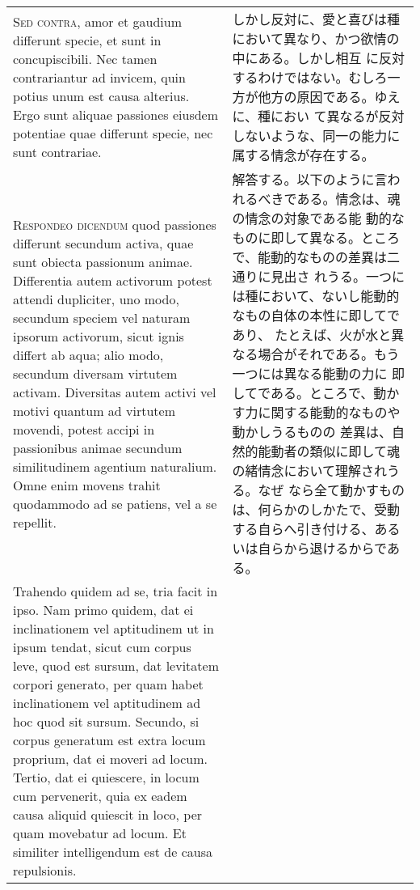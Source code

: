 \documentclass[10pt]{jsarticle} %
\begin{document}
\begin{longtable}{p{21em}p{21em}}
\\



{\scshape Sed contra}, amor et gaudium differunt specie, et sunt in
concupiscibili. Nec tamen contrariantur ad invicem, quin potius unum est
causa alterius. Ergo sunt aliquae passiones eiusdem potentiae quae
differunt specie, nec sunt contrariae.

&

しかし反対に、愛と喜びは種において異なり、かつ欲情の中にある。しかし相互
に反対するわけではない。むしろ一方が他方の原因である。ゆえに、種におい
て異なるが反対しないような、同一の能力に属する情念が存在する。


\\



{\scshape Respondeo dicendum} quod passiones differunt secundum activa, quae sunt
obiecta passionum animae. Differentia autem activorum potest attendi
dupliciter, uno modo, secundum speciem vel naturam ipsorum activorum,
sicut ignis differt ab aqua; alio modo, secundum diversam virtutem
activam. Diversitas autem activi vel motivi quantum ad virtutem movendi,
potest accipi in passionibus animae secundum similitudinem agentium
naturalium. Omne enim movens trahit quodammodo ad se patiens, vel a se
repellit. 


&

解答する。以下のように言われるべきである。情念は、魂の情念の対象である能
 動的なものに即して異なる。ところで、能動的なものの差異は二通りに見出さ
 れうる。一つには種において、ないし能動的なもの自体の本性に即してであり、
 たとえば、火が水と異なる場合がそれである。もう一つには異なる能動の力に
 即してである。ところで、動かす力に関する能動的なものや動かしうるものの
 差異は、自然的能動者の類似に即して魂の緒情念において理解されうる。なぜ
 なら全て動かすものは、何らかのしかたで、受動する自らへ引き付ける、ある
 いは自らから退けるからである。


\\


Trahendo quidem ad se, tria facit in ipso. Nam primo quidem,
dat ei inclinationem vel aptitudinem ut in ipsum tendat, sicut cum
corpus leve, quod est sursum, dat levitatem corpori generato, per quam
habet inclinationem vel aptitudinem ad hoc quod sit sursum. Secundo, si
corpus generatum est extra locum proprium, dat ei moveri ad
locum. Tertio, dat ei quiescere, in locum cum pervenerit, quia ex eadem
causa aliquid quiescit in loco, per quam movebatur ad locum. Et
similiter intelligendum est de causa repulsionis. 


\end{longtable}
\end{document}
